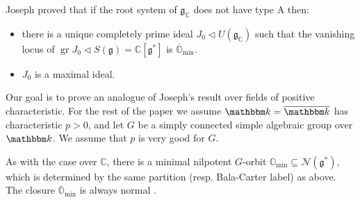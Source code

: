 \documentclass[twoside,12pt,reqno]{amsart}
\theoremstyle{remark}
\numberwithin{equation}{section}
\def\bar{\overline}
\def\k{{\mathbbm k}}
\def\gr{\operatorname{gr}}
\def\o{\overline}
\def\C{{\mathbb C}}
\def\O{{\mathbb O}}
\def\g{{\mathfrak g}}
\newcommand{\Nc}{\mathcal{N}}
\renewcommand{\min}{\operatorname{min}}
\begin{document}
Joseph proved \cite{Jo} that if the root system of $\g_\C$  does not have type {\sf A} then:
\begin{itemize}
\setlength{\itemsep}{4pt}
    \item[(i)] there is a unique completely prime ideal $J_0 \lhd U(\g_\C)$ such that the vanishing locus of $\gr J_0 \lhd S(\g) = \C[\g^*]$ is $\o\O_{\min}$.
    \item[(ii)] $J_0$ is a maximal ideal.
\end{itemize}

Our goal is to prove an analogue of Joseph's result over fields of positive characteristic. For the rest of the paper we assume $\k = \bar \k$ has characteristic $p>0$, and let $G$ be a simply connected simple algebraic group over $\k$. We assume that $p$ is very good for $G$.

As with the case over $\C$, there is a minimal nilpotent $G$-orbit $\O_{\min} \subseteq \Nc(\g^*)$, which is determined by the same partition (resp. Bala-Carter label) as above. The closure $\o\O_{\min}$ is always normal \cite[]{JaNO}.
\end{document}

